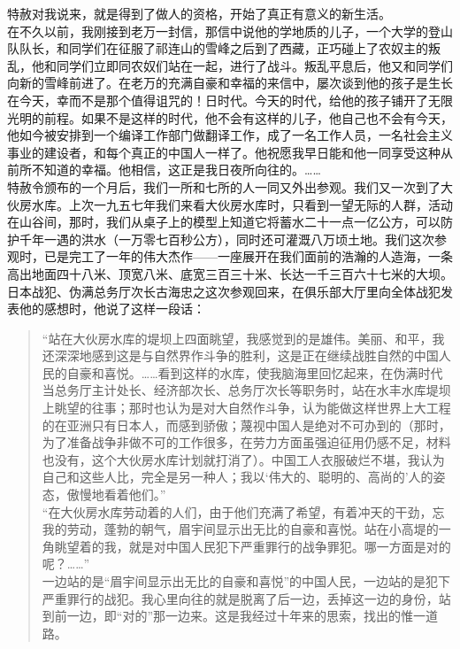 特赦对我说来，就是得到了做人的资格，开始了真正有意义的新生活。\\

在不久以前，我刚接到老万一封信，那信中说他的学地质的儿子，一个大学的登山队队长，和同学们在征服了祁连山的雪峰之后到了西藏，正巧碰上了农奴主的叛乱，他和同学们立即同农奴们站在一起，进行了战斗。叛乱平息后，他又和同学们向新的雪峰前进了。在老万的充满自豪和幸福的来信中，屡次谈到他的孩子是生长在今天，幸而不是那个值得诅咒的！日时代。今天的时代，给他的孩子铺开了无限光明的前程。如果不是这样的时代，他不会有这样的儿子，他自己也不会有今天，他如今被安排到一个编译工作部门做翻译工作，成了一名工作人员，一名社会主义事业的建设者，和每个真正的中国人一样了。他祝愿我早日能和他一同享受这种从前所不知道的幸福。他相信，这正是我日夜所向往的。……\\

特赦令颁布的一个月后，我们一所和七所的人一同又外出参观。我们又一次到了大伙房水库。上次一九五七年我们来看大伙房水库时，只看到一望无际的人群，活动在山谷间，那时，我们从桌子上的模型上知道它将蓄水二十一点一亿公方，可以防护千年一遇的洪水（一万零七百秒公方），同时还可灌溉八万顷土地。我们这次参观时，已是完工了一年的伟大杰作——一座展开在我们面前的浩瀚的人造海，一条高出地面四十八米、顶宽八米、底宽三百三十米、长达一千三百六十七米的大坝。日本战犯、伪满总务厅次长古海忠之这次参观回来，在俱乐部大厅里向全体战犯发表他的感想时，他说了这样一段话：\\

\begin{quote}
	“站在大伙房水库的堤坝上四面眺望，我感觉到的是雄伟。美丽、和平，我还深深地感到这是与自然界作斗争的胜利，这是正在继续战胜自然的中国人民的自豪和喜悦。……看到这样的水库，使我脑海里回忆起来，在伪满时代当总务厅主计处长、经济部次长、总务厅次长等职务时，站在水丰水库堤坝上眺望的往事；那时也认为是对大自然作斗争，认为能做这样世界上大工程的在亚洲只有日本人，而感到骄傲；蔑视中国人是绝对不可办到的（那时，为了准备战争非做不可的工作很多，在劳力方面虽强迫征用仍感不足，材料也没有，这个大伙房水库计划就打消了）。中国工人衣服破烂不堪，我认为自己和这些人比，完全是另一种人；我以‘伟大的、聪明的、高尚的’人的姿态，傲慢地看着他们。”\\

“在大伙房水库劳动着的人们，由于他们充满了希望，有着冲天的干劲，忘我的劳动，蓬勃的朝气，眉宇间显示出无比的自豪和喜悦。站在小高堤的一角眺望着的我，就是对中国人民犯下严重罪行的战争罪犯。哪一方面是对的呢？……”\\

一边站的是“眉宇间显示出无比的自豪和喜悦”的中国人民，一边站的是犯下严重罪行的战犯。我心里向往的就是脱离了后一边，丢掉这一边的身份，站到前一边，即“对的”那一边来。这是我经过十年来的思索，找出的惟一道路。\\
\end{quote}

